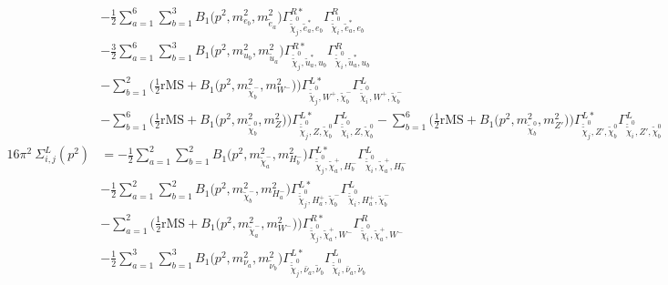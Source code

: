 \begin{itemize}
\begin{align}
 &-\frac{1}{2} \sum_{a=1}^{6}\sum_{b=1}^{3}{B_1\Big(p^{2},m^2_{e_{{b}}},m^2_{\tilde{e}_{{a}}}\Big)} {\Gamma^{R*}_{\check{\tilde{\chi}}^0_{{j}},\tilde{e}^*_{{a}},e_{{b}}}} {\Gamma^R_{\check{\tilde{\chi}}^0_{{i}},\tilde{e}^*_{{a}},e_{{b}}}}  \nonumber \\ 
 &-\frac{3}{2} \sum_{a=1}^{6}\sum_{b=1}^{3}{B_1\Big(p^{2},m^2_{u_{{b}}},m^2_{\tilde{u}_{{a}}}\Big)} {\Gamma^{R*}_{\check{\tilde{\chi}}^0_{{j}},\tilde{u}^*_{{a}},u_{{b}}}} {\Gamma^R_{\check{\tilde{\chi}}^0_{{i}},\tilde{u}^*_{{a}},u_{{b}}}}  \nonumber \\ 
 &- \sum_{b=1}^{2}\Big(\frac{1}{2} \text{rMS}  + {B_1\Big(p^{2},m^2_{\tilde{\chi}^-_{{b}}},m^2_{W^-}\Big)}\Big){\Gamma^{L*}_{\check{\tilde{\chi}}^0_{{j}},W^+,\tilde{\chi}^-_{{b}}}} {\Gamma^L_{\check{\tilde{\chi}}^0_{{i}},W^+,\tilde{\chi}^-_{{b}}}}  \nonumber \\ 
 &- \sum_{b=1}^{6}\Big(\frac{1}{2} \text{rMS}  + {B_1\Big(p^{2},m^2_{\tilde{\chi}^0_{{b}}},m^2_{Z}\Big)}\Big){\Gamma^{L*}_{\check{\tilde{\chi}}^0_{{j}},Z,\tilde{\chi}^0_{{b}}}} {\Gamma^L_{\check{\tilde{\chi}}^0_{{i}},Z,\tilde{\chi}^0_{{b}}}}  - \sum_{b=1}^{6}\Big(\frac{1}{2} \text{rMS}  + {B_1\Big(p^{2},m^2_{\tilde{\chi}^0_{{b}}},m^2_{{Z'}}\Big)}\Big){\Gamma^{L*}_{\check{\tilde{\chi}}^0_{{j}},{Z'},\tilde{\chi}^0_{{b}}}} {\Gamma^L_{\check{\tilde{\chi}}^0_{{i}},{Z'},\tilde{\chi}^0_{{b}}}}  \\ 
16\pi^2 \ \Sigma^L_{i,j}(p^2) &= -\frac{1}{2} \sum_{a=1}^{2}\sum_{b=1}^{2}{B_1\Big(p^{2},m^2_{\tilde{\chi}^-_{{a}}},m^2_{H^-_{{b}}}\Big)} {\Gamma^{L*}_{\check{\tilde{\chi}}^0_{{j}},\tilde{\chi}^+_{{a}},H^-_{{b}}}} {\Gamma^L_{\check{\tilde{\chi}}^0_{{i}},\tilde{\chi}^+_{{a}},H^-_{{b}}}}  \nonumber \\ 
 &-\frac{1}{2} \sum_{a=1}^{2}\sum_{b=1}^{2}{B_1\Big(p^{2},m^2_{\tilde{\chi}^-_{{b}}},m^2_{H^-_{{a}}}\Big)} {\Gamma^{L*}_{\check{\tilde{\chi}}^0_{{j}},H^+_{{a}},\tilde{\chi}^-_{{b}}}} {\Gamma^L_{\check{\tilde{\chi}}^0_{{i}},H^+_{{a}},\tilde{\chi}^-_{{b}}}}  \nonumber \\ 
 &- \sum_{a=1}^{2}\Big(\frac{1}{2} \text{rMS}  + {B_1\Big(p^{2},m^2_{\tilde{\chi}^-_{{a}}},m^2_{W^-}\Big)}\Big){\Gamma^{R*}_{\check{\tilde{\chi}}^0_{{j}},\tilde{\chi}^+_{{a}},W^-}} {\Gamma^R_{\check{\tilde{\chi}}^0_{{i}},\tilde{\chi}^+_{{a}},W^-}}  \nonumber \\ 
 &-\frac{1}{2} \sum_{a=1}^{3}\sum_{b=1}^{3}{B_1\Big(p^{2},m^2_{\nu_{{a}}},m^2_{\tilde{\nu}_{{b}}}\Big)} {\Gamma^{L*}_{\check{\tilde{\chi}}^0_{{j}},\bar{\nu}_{{a}},\tilde{\nu}_{{b}}}} {\Gamma^L_{\check{\tilde{\chi}}^0_{{i}},\bar{\nu}_{{a}},\tilde{\nu}_{{b}}}}  \nonumber \\ 

\end{align}
\end{itemize}
